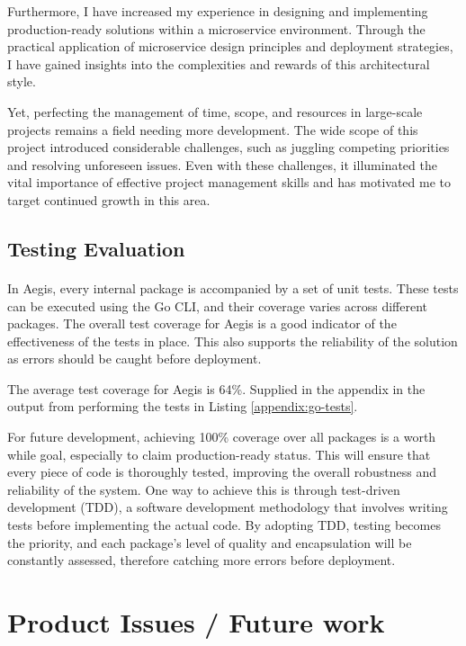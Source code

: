 \documentclass[12pt, conference, final, a4paper, onecolumn, compsoc]{IEEEtran}
\begin{document}
Furthermore, I have increased my experience in designing and implementing
production-ready solutions within a microservice environment. Through the
practical application of microservice design principles and deployment
strategies, I have gained insights into the complexities and rewards of this
architectural style.

Yet, perfecting the management of time, scope, and resources in large-scale
projects remains a field needing more development. The wide scope of this
project introduced considerable challenges, such as juggling competing
priorities and resolving unforeseen issues. Even with these challenges, it
illuminated the vital importance of effective project management skills and has
motivated me to target continued growth in this area.

\subsection{Testing Evaluation}
\paragraph{}
In Aegis, every internal package is accompanied by a set of unit tests. These
tests can be executed using the Go CLI, and their coverage varies across
different packages. The overall test coverage for Aegis is a good indicator of
the effectiveness of the tests in place. This also supports the reliability of
the solution as errors should be caught before deployment.

The average test coverage for Aegis is 64\%. Supplied in the appendix in the
output from performing the tests in Listing \ref{appendix:go-tests}.

For future development, achieving 100\% coverage over all packages is a worth
while goal, especially to claim production-ready status. This will ensure that
every piece of code is thoroughly tested, improving the overall robustness and
reliability of the system. One way to achieve this is through test-driven
development (TDD), a software development methodology that involves writing
tests before implementing the actual code. By adopting TDD, testing becomes the
priority, and each package's level of quality and encapsulation will be
constantly assessed, therefore catching more errors before deployment.


\section{Product Issues / Future work} %
\end{document}
